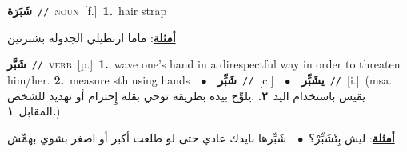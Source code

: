 \documentclass[10pt,a4paper,twoside]{article} %
\begin{document}
\begin{multicols}{2}
{\setlength\topsep{0pt}\textbf{\foreignlanguage{arabic}{شَبَرَة}}\ {\color{gray}\texttt{//}\color{black}}\ \textsc{noun}\ [f.]\ \textbf{1.}~hair strap\  \begin{flushright}\color{gray}\foreignlanguage{arabic}{\textbf{\underline{\foreignlanguage{arabic}{أمثلة}}}: ماما اربطيلي الجدولة بشبرتين}\end{flushright}\color{black}} \vspace{2mm}

{\setlength\topsep{0pt}\textbf{\foreignlanguage{arabic}{شَبَّر}}\ {\color{gray}\texttt{//}\color{black}}\ \textsc{verb}\ [p.]\ \textbf{1.}~wave one's hand in a direspectful way in order to threaten him/her.  \textbf{2.}~measure sth using hands\ \ $\bullet$\ \ \setlength\topsep{0pt}\textbf{\foreignlanguage{arabic}{شَبِّر}}\ {\color{gray}\texttt{//}\color{black}}\ [c.]\ \ $\bullet$\ \ \setlength\topsep{0pt}\textbf{\foreignlanguage{arabic}{يشَبِّر}}\ {\color{gray}\texttt{//}\color{black}}\ [i.]\ \color{gray}(msa. \foreignlanguage{arabic}{يقيس باستخدام اليد}~\foreignlanguage{arabic}{\textbf{٢.}}  .\foreignlanguage{arabic}{يلوِّح بيده بطريقة توحي بقلة إِحترام أو تهديد للشخص المقابل}~\foreignlanguage{arabic}{\textbf{١.}})\color{black}\  \begin{flushright}\color{gray}\foreignlanguage{arabic}{\textbf{\underline{\foreignlanguage{arabic}{أمثلة}}}: ليش بِتْشَبِّرْ؟\ $\bullet$\ \  شَبِّرها بايدك عادي حتى لو طلعت أكبر أو اصغر بشوي بهمِّش}\end{flushright}\color{black}} \vspace{2mm}


\end{multicols}
\end{document}
